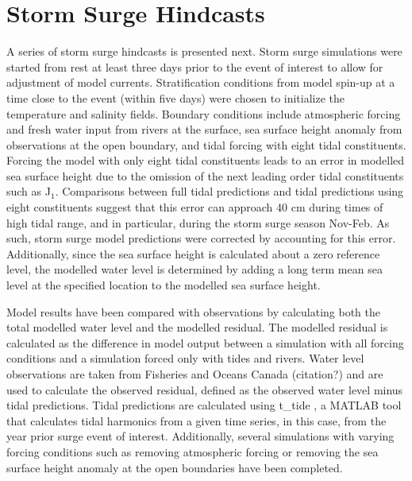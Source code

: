 \documentclass[pdftex,10pt]{article}
\begin{document}
\section{Storm Surge Hindcasts}\label{sec:storm}
A series of storm surge hindcasts is presented next. Storm surge simulations were started from rest at least three days prior to the event of interest to allow for adjustment of model currents. Stratification conditions from model spin-up at a time close to the event (within five days) were chosen to initialize the temperature and salinity fields. Boundary conditions include atmospheric forcing and fresh water input from rivers at the surface, sea surface height anomaly from observations at the open boundary, and tidal forcing with eight tidal constituents. Forcing the model with only eight tidal constituents leads to an error in modelled sea surface height due to the omission of the next leading order tidal constituents such as J$_1$. Comparisons between full tidal predictions and tidal predictions using eight constituents suggest that this error can approach 40 cm during times of high tidal range, and in particular, during the storm surge season Nov-Feb. As such, storm surge model predictions were corrected by accounting for this error. Additionally, since the sea surface height is calculated about a zero reference level, the modelled water level is determined by adding a long term mean sea level at the specified location to the modelled sea surface height.

Model results have been compared with observations by calculating both the total modelled water level and the modelled residual. The modelled residual is calculated as the difference in model output between a simulation with all forcing conditions and a simulation forced only with tides and rivers. Water level observations are taken from Fisheries and Oceans Canada (citation?) and are used to calculate the observed residual, defined as the observed water level minus tidal predictions. Tidal predictions are calculated using t\_tide \citep{pawlowicz2002classical}, a MATLAB tool that calculates tidal harmonics from a given time series, in this case, from the year prior surge event of interest. Additionally, several simulations with varying forcing conditions such as removing atmospheric forcing or removing the sea surface height anomaly at the open boundaries have been completed. 
\end{document}
